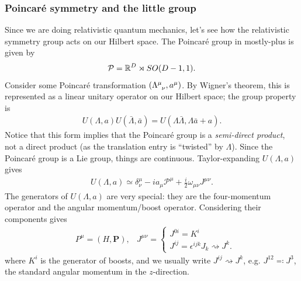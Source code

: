 \documentclass[11pt]{article}
\begin{document}
\subsubsection{Poincaré symmetry and the little group}
Since we are doing relativistic quantum mechanics, let's
see how the relativistic symmetry group acts on our Hilbert space.
The Poincaré group in mostly-plus is given by
\begin{align*}
    \mathcal{P} = \mathbb{R}^D \rtimes SO(D - 1, 1).
\end{align*}
Consider some Poincaré transformation $(\Lambda\indices{^\mu_\nu}, a^\mu)$.
By Wigner's theorem, this is represented as a linear unitary operator on
our Hilbert space; the group property is
\begin{align*}
    U(\Lambda, a) U(\bar{\Lambda}, \bar{a}) = U(\Lambda \bar{\Lambda}, \Lambda \bar{a} + a).
\end{align*}
Notice that this form implies that the Poincaré group is
a \emph{semi-direct product}, not a direct product (as the
translation entry is ``twisted'' by $\Lambda$). Since the Poincaré 
group is a Lie group, things are continuous.
Taylor-expanding $U(\Lambda, a)$ gives
\begin{align*}
    U(\Lambda, a) \simeq \delta^{\mu}_{\nu} - i a_\mu \mathcal{P}^\mu + \frac{i}{2} \omega_{\mu \nu} J^{\mu \nu}.
\end{align*}
The generators of $U(\Lambda, a)$ are very special: they are the
four-momentum operator and the angular momentum/boost operator.
Considering their components gives
\begin{align*}
    & P^\mu = (H, \mathbf{P}),
    & J^{\mu \nu} = \begin{cases}
        J^{0i} = K^i\\
        J^{ij} = \epsilon^{ijk}J_k \rightsquigarrow J^k.
    \end{cases}
\end{align*}
where $K^i$ is the generator of boosts, and we usually write
$J^{ij} \rightsquigarrow J^k$, e.g. $J^{12} \eqqcolon J^3$,
the standard angular momentum in the $z$-direction.
\end{document}
